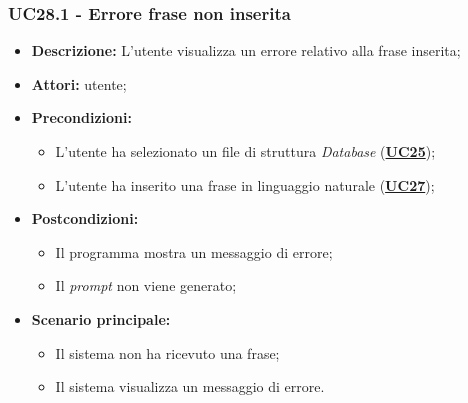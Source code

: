 \subsubsection{UC28.1 - Errore frase non inserita}
\label{sec:UC28.1}
\begin{itemize}
	\item \textbf{Descrizione:} L’utente visualizza un errore relativo alla frase inserita;
	\item \textbf{Attori:} utente;
	\item \textbf{Precondizioni:} 
	\begin{itemize}
		\item L’utente ha selezionato un file di struttura \textit{Database} (\hyperref[sec:UC25]{\textbf{UC25}});
		\item L'utente ha inserito una frase in linguaggio naturale (\hyperref[sec:UC27]{\textbf{UC27}});
	\end{itemize}
	\item \textbf{Postcondizioni:} 
	\begin{itemize}
		\item Il programma mostra un messaggio di errore;
		\item Il \textit{prompt} non viene generato;
	\end{itemize}
	\item \textbf{Scenario principale:} 
	\begin{itemize}
		\item Il sistema non ha ricevuto una frase;
		\item Il sistema visualizza un messaggio di errore.
	\end{itemize}
\end{itemize}


